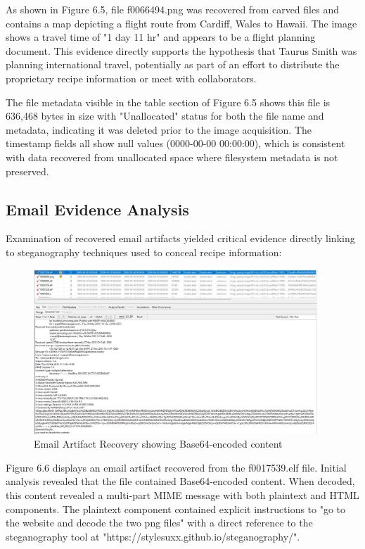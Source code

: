 As shown in Figure 6.5, file f0066494.png was recovered from carved files and contains a map depicting a flight route from Cardiff, Wales to Hawaii. The image shows a travel time of "1 day 11 hr" and appears to be a flight planning document. This evidence directly supports the hypothesis that Taurus Smith was planning international travel, potentially as part of an effort to distribute the proprietary recipe information or meet with collaborators.

The file metadata visible in the table section of Figure 6.5 shows this file is 636,468 bytes in size with "Unallocated" status for both the file name and metadata, indicating it was deleted prior to the image acquisition. The timestamp fields all show null values (0000-00-00 00:00:00), which is consistent with data recovered from unallocated space where filesystem metadata is not preserved.

\subsection{Email Evidence Analysis}
Examination of recovered email artifacts yielded critical evidence directly linking to steganography techniques used to conceal recipe information:

\begin{figure}[h]
    \centering
    \includegraphics[width=0.95\textwidth]{images/Evidence Examination/Image6.png}
    \caption{Email Artifact Recovery showing Base64-encoded content}
    \label{fig:email_artifact}
\end{figure}

Figure 6.6 displays an email artifact recovered from the f0017539.elf file. Initial analysis revealed that the file contained Base64-encoded content. When decoded, this content revealed a multi-part MIME message with both plaintext and HTML components. The plaintext component contained explicit instructions to "go to the website and decode the two png files" with a direct reference to the steganography tool at "https://stylesuxx.github.io/steganography/".

